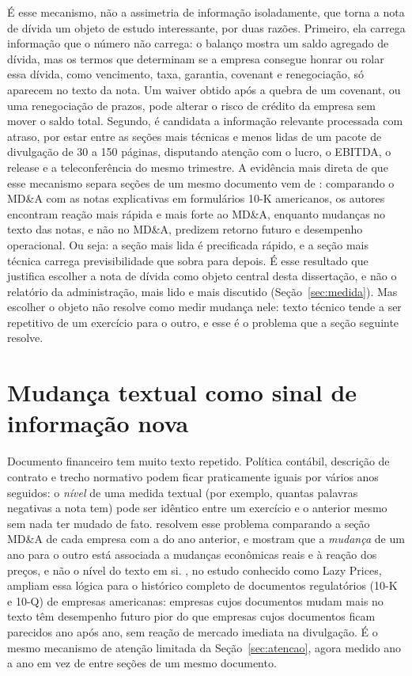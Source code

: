 \documentclass[a4paper,12pt]{report}
\begin{document}
É esse mecanismo, não a assimetria de informação isoladamente, que torna a nota de dívida um objeto de estudo interessante, por duas razões. Primeiro, ela carrega informação que o número não carrega: o balanço mostra um saldo agregado de dívida, mas os termos que determinam se a empresa consegue honrar ou rolar essa dívida, como vencimento, taxa, garantia, covenant e renegociação, só aparecem no texto da nota. Um waiver obtido após a quebra de um covenant, ou uma renegociação de prazos, pode alterar o risco de crédito da empresa sem mover o saldo total. Segundo, é candidata a informação relevante processada com atraso, por estar entre as seções mais técnicas e menos lidas de um pacote de divulgação de 30 a 150 páginas, disputando atenção com o lucro, o EBITDA, o release e a teleconferência do mesmo trimestre. A evidência mais direta de que esse mecanismo separa seções de um mesmo documento vem de : comparando o MD\&A com as notas explicativas em formulários 10-K americanos, os autores encontram reação mais rápida e mais forte ao MD\&A, enquanto mudanças no texto das notas, e não no MD\&A, predizem retorno futuro e desempenho operacional. Ou seja: a seção mais lida é precificada rápido, e a seção mais técnica carrega previsibilidade que sobra para depois. É esse resultado que justifica escolher a nota de dívida como objeto central desta dissertação, e não o relatório da administração, mais lido e mais discutido (Seção~\ref{sec:medida}). Mas escolher o objeto não resolve como medir mudança nele: texto técnico tende a ser repetitivo de um exercício para o outro, e esse é o problema que a seção seguinte resolve.

\section{Mudança textual como sinal de informação nova}
\label{sec:mudanca_sinal}

Documento financeiro tem muito texto repetido. Política contábil, descrição de contrato e trecho normativo podem ficar praticamente iguais por vários anos seguidos: o \emph{nível} de uma medida textual (por exemplo, quantas palavras negativas a nota tem) pode ser idêntico entre um exercício e o anterior mesmo sem nada ter mudado de fato.  resolvem esse problema comparando a seção MD\&A de cada empresa com a do ano anterior, e mostram que a \emph{mudança} de um ano para o outro está associada a mudanças econômicas reais e à reação dos preços, e não o nível do texto em si. , no estudo conhecido como Lazy Prices, ampliam essa lógica para o histórico completo de documentos regulatórios (10-K e 10-Q) de empresas americanas: empresas cujos documentos mudam mais no texto têm desempenho futuro pior do que empresas cujos documentos ficam parecidos ano após ano, sem reação de mercado imediata na divulgação. É o mesmo mecanismo de atenção limitada da Seção~\ref{sec:atencao}, agora medido ano a ano em vez de entre seções de um mesmo documento.
\end{document}
